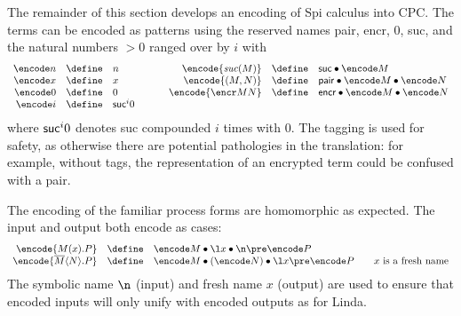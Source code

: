 \documentclass{LMCS}
\begin{document}
The remainder of this section develops an encoding of Spi calculus into CPC.
The terms can be encoded as patterns using the reserved
names {\sf pair}, {\sf encr}, $0$, {\sf suc}, and the natural numbers $>0$ ranged over by $i$ with
\[
\begin{array}{rclrcl}
\encode n &\define& n
\qquad\qquad
&
\encode {{\it suc}(M)} &\define& {\sf suc} \bullet \encode M
\\
\encode x &\define& x
&
\encode {(M,N)} &\define& {\sf pair}\bullet \encode M \bullet \encode N
\\
\encode 0 &\define& 0
&
\encode {\encr M N} &\define& {\sf encr}\bullet \encode M \bullet \encode N
\\
\encode i &\define& {\sf suc}^i 0
\end{array}
\]
where ${\sf suc}^i 0$ denotes {\sf suc} compounded $i$ times with $0$.
The tagging is used for safety, as otherwise there are potential
pathologies in the translation: for example,
without tags, the representation of an encrypted term could be confused
with a pair.

The encoding of the familiar process forms are homomorphic as expected. The input and output
both encode as cases:
\begin{eqnarray*}
\begin{array}{rcll}
\encode {M(x).P} &\define& \encode M \bullet\l x\bullet \n \pre \encode P\\
\encode{\overline{M}\langle N\rangle .P} &\define& \encode M\bullet(\encode N)\bullet\l x\pre\encode P
		&\quad \mbox{$x$ is a fresh name}
\end{array}
\end{eqnarray*}
The symbolic name $\n$ (input) and fresh name $x$ (output) are used to
ensure that encoded inputs will only unify with encoded outputs as for Linda.
\end{document}
